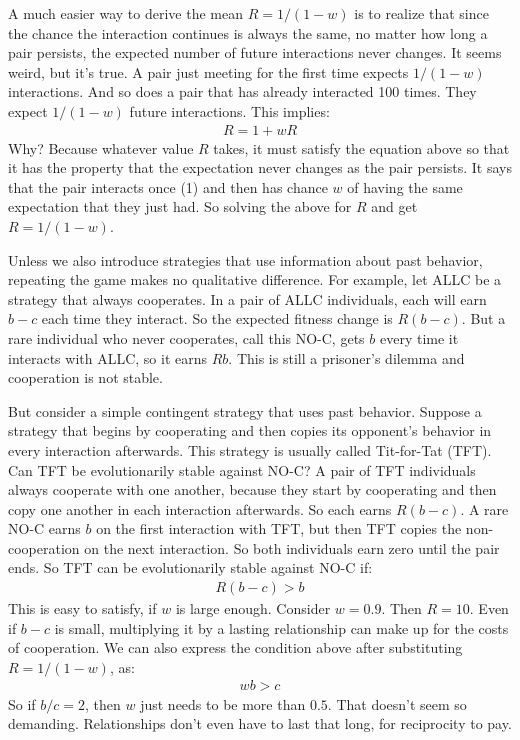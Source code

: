 \documentclass[10pt,reqno]{amsbook}
\numberwithin{equation}{chapter}
\begin{document}
A much easier way to derive the mean $R=1/(1-w)$ is to realize that since the chance the interaction continues is always the same, no matter how long a pair persists, the expected number of future interactions never changes. It seems weird, but it's true. A pair just meeting for the first time expects $1/(1-w)$ interactions. And so does a pair that has already interacted 100 times. They expect $1/(1-w)$ future interactions. This implies:
\begin{align*}
	R = 1 + w R
\end{align*}
Why? Because whatever value $R$ takes, it must satisfy the equation above so that it has the property that the expectation never changes as the pair persists. It says that the pair interacts once (1) and then has chance $w$ of having the same expectation that they just had. So solving the above for $R$ and get $R=1/(1-w)$. 

Unless we also introduce strategies that use information about past behavior, repeating the game makes no qualitative difference. For example, let ALLC be a strategy that always cooperates. In a pair of ALLC individuals, each will earn $b-c$ each time they interact. So the expected fitness change is $R(b-c)$. But a rare individual who never cooperates, call this NO-C, gets $b$ every time it interacts with ALLC, so it earns $Rb$. This is still a prisoner's dilemma and cooperation is not stable.

But consider a simple contingent strategy that uses past behavior. Suppose a strategy that begins by cooperating and then copies its opponent's behavior in every interaction afterwards. This strategy is usually called Tit-for-Tat (TFT). Can TFT be evolutionarily stable against NO-C? A pair of TFT individuals always cooperate with one another, because they start by cooperating and then copy one another in each interaction afterwards. So each earns $R(b-c)$. A rare NO-C earns $b$ on the first interaction with TFT, but then TFT copies the non-cooperation on the next interaction. So both individuals earn zero until the pair ends. So TFT can be evolutionarily stable against NO-C if:
\begin{align*}
	R(b-c) > b
\end{align*}
This is easy to satisfy, if $w$ is large enough. Consider $w=0.9$. Then $R=10$. Even if $b-c$ is small, multiplying it by a lasting relationship can make up for the costs of cooperation. We can also express the condition above after substituting $R=1/(1-w)$, as:
\begin{align*}
	wb>c
\end{align*}
So if $b/c=2$, then $w$ just needs to be more than $0.5$. That doesn't seem so demanding. Relationships don't even have to last that long, for reciprocity to pay.
\end{document}
